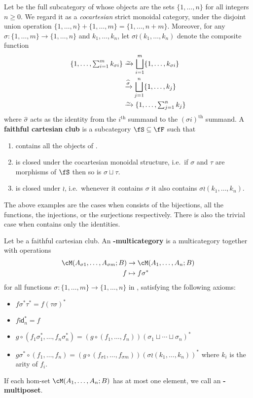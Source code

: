 \documentclass{book}
\def\idfunc{\mathsf{id}}
\begin{document}
\begin{defn}
  Let \fF be the full subcategory of \bSet whose objects are the sets $\{1,\dots, n\}$ for all integers $n\ge 0$.
  We regard it as a \emph{cocartesian} strict monoidal category, under the disjoint union operation $\{1,\dots,n\} + \{1,\dots,m\} = \{1,\dots,n+m\}$.
  Moreover, for any $\sigma : \{1,\dots,m\} \to \{1,\dots,n\}$ and $k_1,\dots,k_n$, let $\sigma \wr (k_1,\dots,k_n)$ denote the composite function
  \begin{align*}
    \{1,\dots,\textstyle\sum_{i=1}^m k_{\sigma i} \}
    & \toiso \bigsqcup_{i=1}^m \{1,\dots,k_{\sigma i}\}\\
    & \xto{\widehat{\sigma}} \bigsqcup_{j=1}^n \{1,\dots,k_{j}\}\\
    & \toiso \{1,\dots,\textstyle\sum_{j=1}^n k_j \}
  \end{align*}
  where $\widehat{\sigma}$ acts as the identity from the $i^{\mathrm{th}}$ summand to the $(\sigma i)^{\mathrm{th}}$ summand.
  A \textbf{faithful cartesian club} is a subcategory $\fS\subseteq \fF$ such that
  \begin{enumerate}
  \item \fS contains all the objects of \fF.
  \item \fS is closed under the cocartesian monoidal structure, i.e.\ if $\sigma$ and $\tau$ are morphisms of $\fS$ then so is $\sigma\sqcup \tau$.
  \item \fS is closed under $\wr$, i.e.\ whenever it contains $\sigma$ it also contains $\sigma \wr (k_1,\dots,k_n)$.
  \end{enumerate}
\end{defn}

The above examples are the cases when \fS consists of the bijections, all the functions, the injections, or the surjections respectively.
There is also the trivial case when \fS contains only the identities.

\begin{defn}
  Let \fS be a faithful cartesian club.
  An \textbf{\fS-multicategory} is a multicategory \cM together with operations
  \begin{align*}
    \cM(A_{\sigma 1},\dots,A_{\sigma m}; B) &\to \cM(A_1,\dots,A_n;B)\\
    f &\mapsto f\sigma^*
  \end{align*}
  for all functions $\sigma : \{1,\dots,m\} \to \{1,\dots,n\}$ in \fS, satisfying the following axioms:
  \begin{itemize}
  \item $f \sigma^* \tau^* = f(\tau\sigma)^*$
  \item $f \idfunc_n^* = f$
  \item $g\circ (f_1 \sigma_1^* ,\dots, f_n \sigma_n^*) = (g \circ (f_1,\dots,f_n))(\sigma_1\sqcup \cdots \sqcup \sigma_n)^*$
  \item $g\sigma^* \circ (f_1,\dots,f_n) = (g\circ (f_{\sigma 1},\dots, f_{\sigma m}))(\sigma \wr (k_1,\dots,k_n))^*$ where $k_i$ is the arity of $f_i$.
  \end{itemize}
  If each hom-set $\cM(A_1,\dots,A_n;B)$ has at most one element, we call \cM an \textbf{\fS-multiposet}.
\end{defn}
\end{document}
